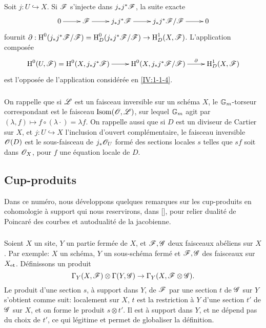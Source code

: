 Soit $j:U\hookrightarrow X$. Si $\mathscr{F}$ s'injecte dans $j_* j^* \mathscr{F}$, la suite 
exacte 
\[\xymatrix{
  0 \ar[r] 
  & \cF \ar[r]
  & j_* j^* \cF \ar[r]
  & j_* j^* \cF / \cF \ar[r]
  & 0
}\]
fournit 
$\partial:\operatorname{H}^0(j_* j^*\mathscr{F}/\mathscr{F}) = \operatorname{H}_D^0(j_* j^* \mathscr{F}/\mathscr{F}) \to \operatorname{H}_D^1(X,\mathscr{F})$. 
L'application compos\'ee 
\[\xymatrix{
  \h^0(U,\cF) = \h^0(X,j_* j^*\cF) \ar[r] 
    & \h^0(X,j_* j^*\cF / \cF) \ar[r]^-\partial 
    & \h_D^1(X,\cF)
}\]
est l'oppos\'ee de l'application consid\'er\'ee en \ref{IV:1-1-4}. 





\subsubsection{}\label{IV:1-1-6}

On rappelle que si $\mathscr{L}$ est un faisceau inversible sur un sch\'ema $X$, le 
$\mathbb{G}_m$-torseur correspondant est le faisceau $\operatorname{Isom}(\mathscr{O},\mathscr{L})$, 
sur lequel $\mathbb{G}_m$ agit par 
$(\lambda,f)\mapsto f\circ (\lambda\cdot) = \lambda f$. On rappelle aussi que 
si $D$ est un diviseur de Cartier sur $X$, et $j:U\hookrightarrow X$ 
l'inclusion d'ouvert compl\'ementaire, le faisceau inversible $\mathscr{O}(D)$ est le 
sous-faisceau de $j_*\mathscr{O}_U$ form\'e des sections locales $s$ telles que $s f$ 
soit dans $\mathscr{O}_X$, pour $f$ une \'equation locale de $D$.










\subsection{Cup-produits}\label{IV:1-2}

Dans ce num\'ero, nous d\'eveloppons quelques remarques sur les cup-produits en 
cohomologie \`a support qui nous reservirons, dans [], pour relier 
dualit\'e de Poincar\'e des courbes et autodualit\'e de la jacobienne.

\subsubsection{}\label{IV:1-2-1}

Soient $X$ un site, $Y$ un partie ferm\'ee de $X$, et $\mathscr{F},\mathscr{G}$ deux faisceaux 
ab\'eliens sur $X$. Par exemple: $X$ un sch\'ema, $Y$ un sous-sch\'ema ferm\'e 
et $\mathscr{F},\mathscr{G}$ des faisceaux sur ${X}_{\textnormal{et}}$. D\'efinissons un produit 
\begin{equation}\label{IV:eq:1-2-1-1}
  \Gamma_Y(X,\mathscr{F})\otimes \Gamma(Y,\mathscr{G}) \to \Gamma_Y(X,\mathscr{F}\otimes\mathscr{G}) \text{.}
\end{equation}
Le produit d'une section $s$, \`a support dans $Y$, de $\mathscr{F}$ par une section 
$t$ de $\mathscr{G}$ sur $Y$ s'obtient comme suit: localement sur $X$, $t$ est la 
restriction \`a $Y$ d'une section $t'$ de $\mathscr{G}$ sur $X$, et on forme le produit 
$s\otimes t'$. Il est \`a support dans $Y$, et ne d\'epend pas du choix de 
$t'$, ce qui l\'egitime et permet de globaliser la d\'efinition.

